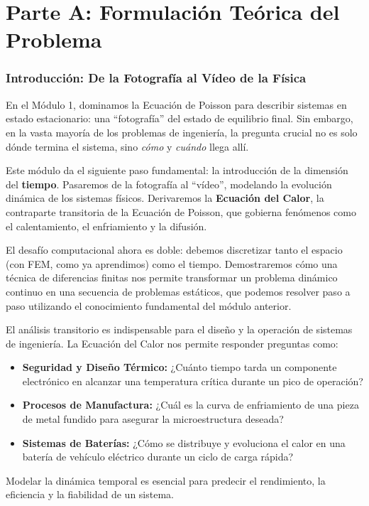 \part*{Parte A: Formulación Teórica del Problema}

\section{Introducción: De la Fotografía al Vídeo de la Física}
En el Módulo 1, dominamos la Ecuación de Poisson para describir sistemas en estado estacionario: una ``fotografía'' del estado de equilibrio final. Sin embargo, en la vasta mayoría de los problemas de ingeniería, la pregunta crucial no es solo dónde termina el sistema, sino \textit{cómo} y \textit{cuándo} llega allí.

Este módulo da el siguiente paso fundamental: la introducción de la dimensión del \textbf{tiempo}. Pasaremos de la fotografía al ``vídeo'', modelando la evolución dinámica de los sistemas físicos. Derivaremos la \textbf{Ecuación del Calor}, la contraparte transitoria de la Ecuación de Poisson, que gobierna fenómenos como el calentamiento, el enfriamiento y la difusión.

El desafío computacional ahora es doble: debemos discretizar tanto el espacio (con FEM, como ya aprendimos) como el tiempo. Demostraremos cómo una técnica de diferencias finitas nos permite transformar un problema dinámico continuo en una secuencia de problemas estáticos, que podemos resolver paso a paso utilizando el conocimiento fundamental del módulo anterior.

\begin{infobox}
    El análisis transitorio es indispensable para el diseño y la operación de sistemas de ingeniería. La Ecuación del Calor nos permite responder preguntas como:
    \begin{itemize}
        \item \textbf{Seguridad y Diseño Térmico:} ¿Cuánto tiempo tarda un componente electrónico en alcanzar una temperatura crítica durante un pico de operación?
        \item \textbf{Procesos de Manufactura:} ¿Cuál es la curva de enfriamiento de una pieza de metal fundido para asegurar la microestructura deseada?
        \item \textbf{Sistemas de Baterías:} ¿Cómo se distribuye y evoluciona el calor en una batería de vehículo eléctrico durante un ciclo de carga rápida?
    \end{itemize}
    Modelar la dinámica temporal es esencial para predecir el rendimiento, la eficiencia y la fiabilidad de un sistema.
\end{infobox}

